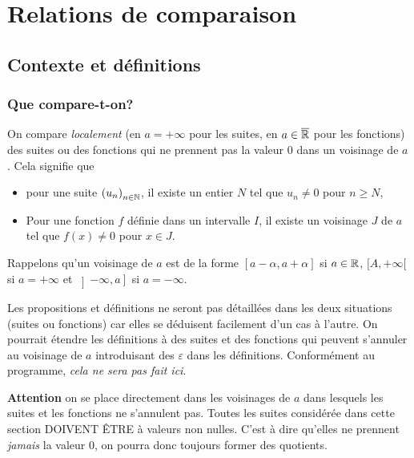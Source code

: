 

\section{Relations de comparaison}
\subsection{Contexte et définitions}
\subsubsection{Que compare-t-on?}
On compare \emph{localement} (en $a=+\infty$ pour les suites, en $a\in \overline{\mathbb{R}}$ pour les fonctions) des suites ou des fonctions qui ne prennent pas la valeur $0$ dans un voisinage de $a$. Cela signifie que 
\begin{itemize}
 \item pour une suite $\left( u_n \right)_{n \in \mathbb{N}}$, il existe un entier $N$ tel que $u_n \neq 0$ pour $n\geq N$,
 \item Pour une fonction $f$ définie dans un intervalle $I$, il existe un voisinage $J$ de $a$ tel que $f(x)\neq 0$ pour $x\in J$. 
\end{itemize}
Rappelons qu'un voisinage de $a$ est de la forme $[a-\alpha, a+\alpha]$ si $a\in \mathbb{R}$, $[A,+\infty[$ si $a=+\infty$ et $\left] -\infty, a\right]$ si $a=-\infty$. 

Les propositions et définitions ne seront pas détaillées dans les deux situations (suites ou fonctions) car elles se déduisent facilement d'un cas à l'autre. On pourrait étendre les définitions à des suites et des fonctions qui peuvent s'annuler au voisinage de $a$ introduisant des $\varepsilon$ dans les définitions. Conformément au programme, \emph{cela ne sera pas fait ici}.

\textbf{Attention} on se place directement dans les voisinages de $a$ dans lesquels les suites et les fonctions ne s'annulent pas. Toutes les suites considérée dans cette section DOIVENT \^ETRE à valeurs non nulles. C'est à dire qu'elles ne prennent \emph{jamais} la valeur $0$, on pourra donc toujours former des quotients.

